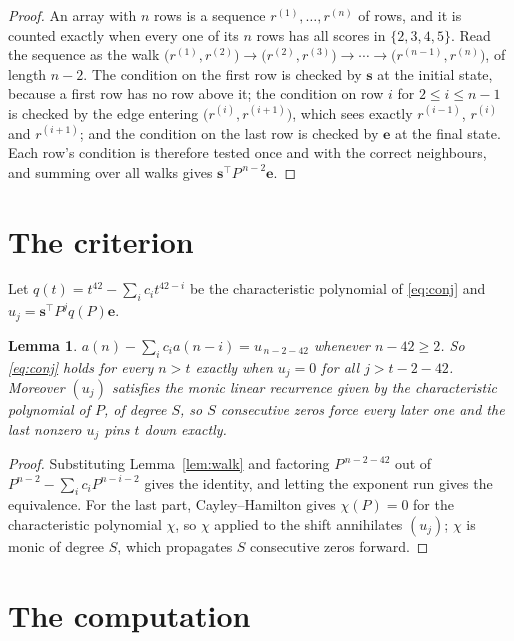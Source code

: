 \documentclass[11pt,a4paper]{article}
\theoremstyle{plain}
\newtheorem{lemma}[theorem]{Lemma}
\theoremstyle{definition}
\begin{document}
\begin{proof}
An array with $n$ rows is a sequence $r^{(1)},\dots,r^{(n)}$ of rows, and it is counted
exactly when every one of its $n$ rows has all scores in $\{2,3,4,5\}$. Read the sequence as the
walk $\bigl(r^{(1)},r^{(2)}\bigr)\to\bigl(r^{(2)},r^{(3)}\bigr)\to\cdots\to
\bigl(r^{(n-1)},r^{(n)}\bigr)$, of length $n-2$. The condition on the first row is
checked by $\mathbf{s}$ at the initial state, because a first row has no row above it; the
condition on row $i$ for $2\le i\le n-1$ is checked by the edge entering
$\bigl(r^{(i)},r^{(i+1)}\bigr)$, which sees exactly $r^{(i-1)}$, $r^{(i)}$ and
$r^{(i+1)}$; and the condition on the last row is checked by $\mathbf{e}$ at the final
state. Each row's condition is therefore tested once and with the correct neighbours, and
summing over all walks gives $\mathbf{s}^{\!\top}P^{\,n-2}\mathbf{e}$.
\end{proof}

\section{The criterion}

Let $q(t)=t^{42}-\sum_i c_i t^{42-i}$ be the characteristic polynomial of
\eqref{eq:conj} and $u_j=\mathbf{s}^{\!\top}P^{j}q(P)\mathbf{e}$.

\begin{lemma}\label{lem:crit}
$a(n)-\sum_i c_i a(n-i)=u_{\,n-2-42}$ whenever $n-42\ge2$. So \eqref{eq:conj}
holds for every $n>t$ exactly when $u_j=0$ for all $j>t-2-42$. Moreover $(u_j)$
satisfies the monic linear recurrence given by the characteristic polynomial of $P$, of
degree $S$, so $S$ consecutive zeros force every later one and the last nonzero $u_j$ pins
$t$ down exactly.
\end{lemma}

\begin{proof}
Substituting Lemma~\ref{lem:walk} and factoring $P^{\,n-2-42}$ out of
$P^{n-2}-\sum_i c_i P^{n-i-2}$ gives the identity, and letting the exponent run gives the
equivalence. For the last part, Cayley--Hamilton gives $\chi(P)=0$ for the characteristic
polynomial $\chi$, so $\chi$ applied to the shift annihilates $(u_j)$; $\chi$ is monic of
degree $S$, which propagates $S$ consecutive zeros forward.
\end{proof}

\section{The computation}
\end{document}

